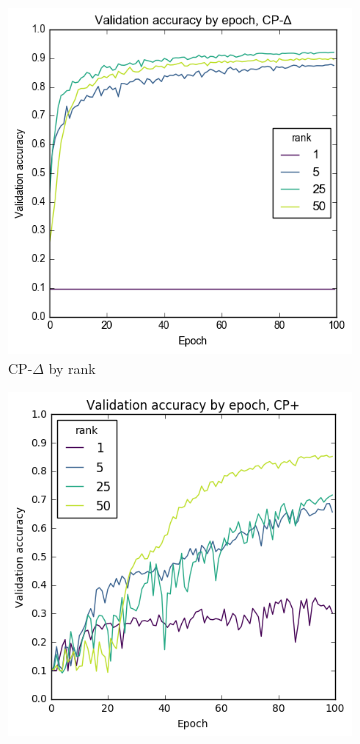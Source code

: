 \begin{figure}[ht]
\begin{subfigure}[t]{0.45\textwidth}
	\includegraphics[width=\textwidth]{exps/mnist/cp-del-rank}
	\caption{CP-\(\Delta\) by rank}
\end{subfigure}\hfill
\begin{subfigure}[t]{0.45\textwidth}
	\includegraphics[width=\textwidth]{exps/mnist/cp+rank}

\end{subfigure}
\end{figure}

